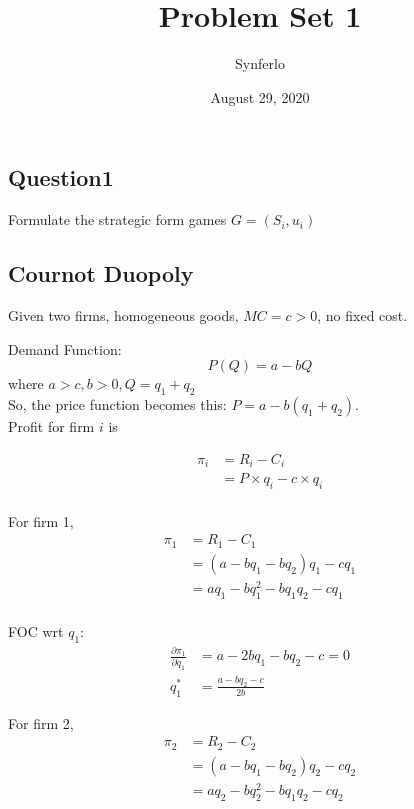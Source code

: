 \documentclass[12pt]{article}
\title{Problem Set 1}
\author{Synferlo}
\date{August 29, 2020}
\newcommand{\rr}[1]{^{#1}}
\newcommand{\fp}[2]{\frac{\partial{#1}}{\partial{#2}}}
\newcommand{\e}[1]{$ #1 $}
\begin{document}
\begin{spacing}{1.5}
    \maketitle
    \newpage


    \section{Question1}

        Formulate the strategic form games
        $G = (S_i, u_i)$

        \subsection{Cournot Duopoly}
            Given two firms, homogeneous goods, $MC = c > 0$, no fixed cost.

            Demand Function:
            $$P(Q) = a-bQ$$
            where $a > c, b > 0, Q = q_1 + q_2$\\

            So, the price function becomes this: \e{P = a - b(q_1 + q_2)}.\\
            Profit for firm \e{i} is

            \begin{align*}
                \pi_i &= R_i - C_i\\    
                        & = P \times q_i - c \times q_i\\
            \end{align*}
            
            For firm 1,
            \begin{align*}
                \pi_1 &= R_1 - C_1\\
                    & = ( a - bq_1 - bq_2)q_1 - cq_1\\
                    & = aq_1 - bq_1\rr2 - bq_1q_2 - cq_1\\
            \end{align*}

            FOC wrt \e{q_1}:
            \begin{align}
                \fp{\pi_1}{q_1} & = a - 2bq_1 - bq_2 -c = 0\\
                q_1\rr* & = \frac{a - bq_2 - c}{2b}
            \end{align}

            For firm 2,
            \begin{align*}
                \pi_2 &= R_2 - C_2\\
                    & = ( a - bq_1 - bq_2)q_2 - cq_2\\
                    & = aq_2 - bq_2\rr2 - bq_1q_2 - cq_2\\
            \end{align*}


\end{spacing}
\end{document}
